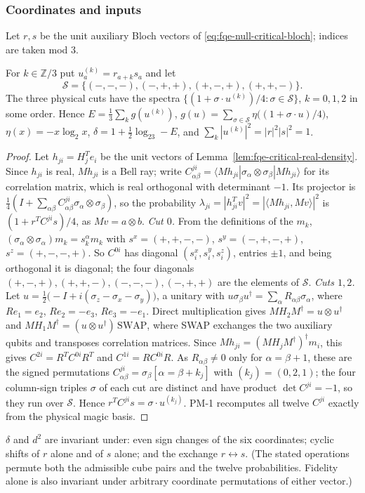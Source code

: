 \subsubsection*{Coordinates and inputs}
Let $r,s$ be the unit auxiliary Bloch vectors of \eqref{eq:fqe-null-critical-bloch}; indices are taken mod $3$.
\begin{lemma}\label{lem:fqe-p1-cuts}
For $k\in\mathbb Z/3$ put $u^{(k)}_a=r_{a+k}s_a$ and let
\[
 \mathcal S=\{(-,-,-),(-,+,+),(+,-,+),(+,+,-)\}.
\]
The three physical cuts have the spectra $\{(1+\sigma\cdot u^{(k)})/4:\sigma\in\mathcal S\}$, $k=0,1,2$ in some order.
Hence $E=\frac13\sum_kg(u^{(k)})$, $g(u)=\sum_{\sigma\in\mathcal S}\eta\bigl((1+\sigma\cdot u)/4\bigr)$,
$\eta(x)=-x\log_2x$, $\delta=1+\tfrac12\log_23-E$, and $\sum_k|u^{(k)}|^2=|r|^2|s|^2=1$.
\end{lemma}
\begin{proof}
Let $h_{ji}=H_j^Te_i$ be the unit vectors of Lemma~\ref{lem:fqe-critical-real-density}. Since $h_{ji}$ is real,
$Mh_{ji}$ is a Bell ray; write
$C^{ji}_{\alpha\beta}=\langle Mh_{ji}|\sigma_\alpha\otimes\sigma_\beta|Mh_{ji}\rangle$ for its correlation matrix, which is real
orthogonal with determinant $-1$. Its projector is $\tfrac14(I+\sum_{\alpha\beta}C^{ji}_{\alpha\beta}\sigma_\alpha\otimes\sigma_\beta)$, so
the probability $\lambda_{ji}=|h_{ji}^Tv|^2=|\langle Mh_{ji},Mv\rangle|^2$ is $(1+r^TC^{ji}s)/4$, as $Mv=a\otimes b$.
\emph{Cut $0$.} From the definitions of the $m_k$, $(\sigma_\alpha\otimes\sigma_\alpha)m_k=s^\alpha_km_k$ with
$s^x=(+,+,-,-)$, $s^y=(-,+,-,+)$, $s^z=(+,-,-,+)$. So $C^{0i}$ has diagonal $(s^x_i,s^y_i,s^z_i)$, entries $\pm1$, and being
orthogonal it is diagonal; the four diagonals $(+,-,+),(+,+,-),(-,-,-),(-,+,+)$ are the elements of $\mathcal S$.
\emph{Cuts $1,2$.} Let $u=\tfrac12\bigl(-I+i(\sigma_z-\sigma_x-\sigma_y)\bigr)$, a unitary with $u\sigma_\beta u^\dagger=\sum_\alpha
R_{\alpha\beta}\sigma_\alpha$, where $Re_1=e_2$, $Re_2=-e_3$, $Re_3=-e_1$. Direct multiplication gives
$MH_2M^\dagger=u\otimes u^\dagger$ and $MH_1M^\dagger=(u\otimes u^\dagger)\,\mathrm{SWAP}$, where SWAP exchanges the two auxiliary
qubits and transposes correlation matrices. Since $Mh_{ji}=(MH_jM^\dagger)^\dagger m_i$, this gives
$C^{2i}=R^TC^{0i}R^T$ and $C^{1i}=RC^{0i}R$. As $R_{\alpha\beta}\ne0$ only for $\alpha=\beta+1$, these are the signed
permutations $C^{ji}_{\alpha\beta}=\sigma_\beta[\alpha=\beta+k_j]$ with $(k_j)=(0,2,1)$; the four column-sign triples $\sigma$ of
each cut are distinct and have product $\det C^{ji}=-1$, so they run over $\mathcal S$. Hence
$r^TC^{ji}s=\sigma\cdot u^{(k_j)}$. PM-1 recomputes all twelve $C^{ji}$ exactly from the physical magic basis.
\end{proof}
\begin{lemma}[Symmetries; PM-2]\label{lem:fqe-p1-sym}
$\delta$ and $d^2$ are invariant under: even sign changes of the six coordinates; cyclic shifts of $r$ alone and of $s$
alone; and the exchange $r\leftrightarrow s$.  (The stated operations permute both the admissible cube pairs and the twelve
probabilities. Fidelity alone is also invariant under arbitrary coordinate permutations
of either vector.)
\end{lemma}

